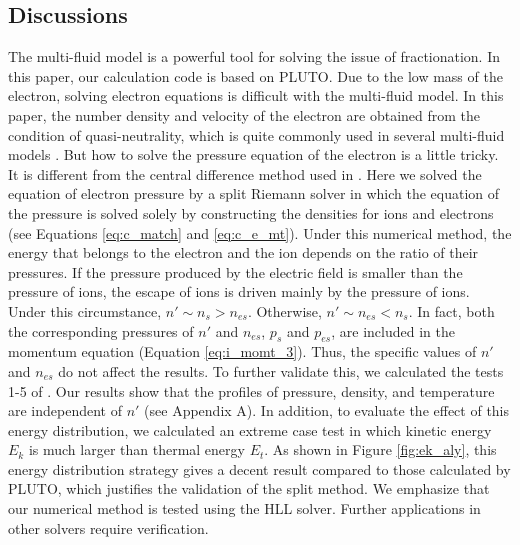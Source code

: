 \documentclass[journal, onecolumn]{aastex631}
\begin{document}
\begin{CJK*}{UTF8}{gbsn}
\section{Discussions}\label{sec:Discussions}

The multi-fluid model is a powerful tool for solving the issue of fractionation. In this paper, our calculation code is based on PLUTO. Due to the low mass of the electron, solving electron equations is difficult with the multi-fluid model. In this paper, the number density and velocity of the electron are obtained from the condition of quasi-neutrality, which is quite commonly used in several multi-fluid models \citep{Toth2012, Dong2017}. But how to solve the pressure equation of the electron is a little tricky. It is different from the central difference method used in \cite{Toth2012}. Here we solved the equation of electron pressure by a split Riemann solver in which the equation of the pressure is solved solely by constructing the densities for ions and electrons (see Equations \ref{eq:c_match} and \ref{eq:c_e_mt}). Under this numerical method, the energy that belongs to the electron and the ion depends on the ratio of their pressures. If the pressure produced by the electric field is smaller than the pressure of ions, the escape of ions is driven mainly by the pressure of ions. Under this circumstance, $n'\sim n_{s}>n_{es}$. Otherwise, $n'\sim n_{es}< n_{s}$. In fact, both the corresponding pressures of $n'$ and $n_{es}$, $p_{s}$ and $p_{es}$, are included in the momentum equation (Equation \ref{eq:i_momt_3}). Thus, the specific values of $n'$ and $n_{es}$ do not affect the results. To further validate this, we calculated the tests 1-5 of \cite{Toro2009}. Our results show that the profiles of pressure, density, and temperature are independent of $n'$ (see Appendix A). In addition, to evaluate the effect of this energy distribution, we calculated an extreme case test in which kinetic energy $E_k$ is much larger than thermal energy $E_t$. As shown in Figure \ref{fig:ek_aly}, this energy distribution strategy gives a decent result compared to those calculated by PLUTO, which justifies the validation of the split method. We emphasize that our numerical method is tested using the HLL solver. Further applications in other solvers require verification.


\end{CJK*}
\end{document}

